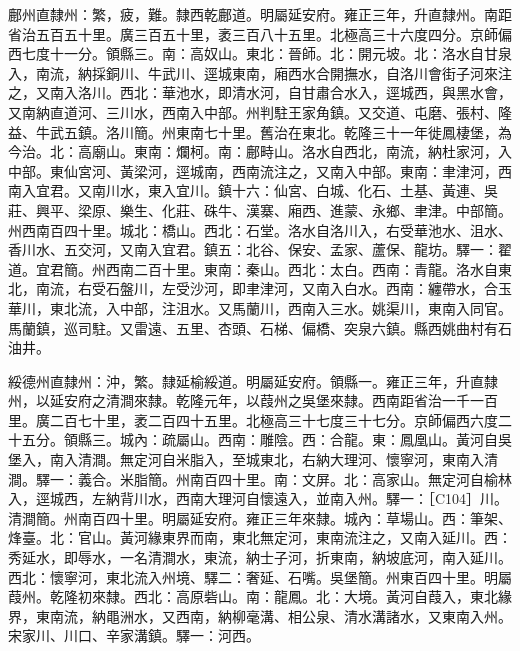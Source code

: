 \begin{pinyinscope}
鄜州直隸州：繁，疲，難。隸西乾鄜道。明屬延安府。雍正三年，升直隸州。南距省治五百五十里。廣三百五十里，袤三百八十五里。北極高三十六度四分。京師偏西七度十一分。領縣三。南：高奴山。東北：晉師。北：開元坡。北：洛水自甘泉入，南流，納採銅川、牛武川、逕城東南，廂西水合開撫水，自洛川會街子河來注之，又南入洛川。西北：華池水，即清水河，自甘肅合水入，逕城西，與黑水會，又南納直道河、三川水，西南入中部。州判駐王家角鎮。又交道、屯磨、張村、隆益、牛武五鎮。洛川簡。州東南七十里。舊治在東北。乾隆三十一年徙鳳棲堡，為今治。北：高廟山。東南：爛柯。南：鄜畤山。洛水自西北，南流，納杜家河，入中部。東仙宮河、黃梁河，逕城南，西南流注之，又南入中部。東南：聿津河，西南入宜君。又南川水，東入宜川。鎮十六：仙宮、白城、化石、土基、黃連、吳莊、興平、梁原、樂生、化莊、硃牛、漢寨、廂西、進蒙、永鄉、聿津。中部簡。州西南百四十里。城北：橋山。西北：石堂。洛水自洛川入，右受華池水、沮水、香川水、五交河，又南入宜君。鎮五：北谷、保安、孟家、蘆保、龍坊。驛一：翟道。宜君簡。州西南二百十里。東南：秦山。西北：太白。西南：青龍。洛水自東北，南流，右受石盤川，左受沙河，即聿津河，又南入白水。西南：纏帶水，合玉華川，東北流，入中部，注沮水。又馬蘭川，西南入三水。姚渠川，東南入同官。馬蘭鎮，巡司駐。又雷遠、五里、杏頭、石梯、偏橋、突泉六鎮。縣西姚曲村有石油井。

綏德州直隸州：沖，繁。隸延榆綏道。明屬延安府。領縣一。雍正三年，升直隸州，以延安府之清澗來隸。乾隆元年，以葭州之吳堡來隸。西南距省治一千一百里。廣二百七十里，袤二百四十五里。北極高三十七度三十七分。京師偏西六度二十五分。領縣三。城內：疏屬山。西南：雕陰。西：合龍。東：鳳凰山。黃河自吳堡入，南入清澗。無定河自米脂入，至城東北，右納大理河、懷寧河，東南入清澗。驛一：義合。米脂簡。州南百四十里。南：文屏。北：高家山。無定河自榆林入，逕城西，左納背川水，西南大理河自懷遠入，並南入州。驛一：［C104］川。清澗簡。州南百四十里。明屬延安府。雍正三年來隸。城內：草場山。西：筆架、烽臺。北：官山。黃河緣東界而南，東北無定河，東南流注之，又南入延川。西：秀延水，即辱水，一名清澗水，東流，納士子河，折東南，納坡底河，南入延川。西北：懷寧河，東北流入州境、驛二：奢延、石嘴。吳堡簡。州東百四十里。明屬葭州。乾隆初來隸。西北：高原砦山。南：龍鳳。北：大境。黃河自葭入，東北緣界，東南流，納黽洲水，又西南，納柳毫溝、相公泉、清水溝諸水，又東南入州。宋家川、川口、辛家溝鎮。驛一：河西。


\end{pinyinscope}